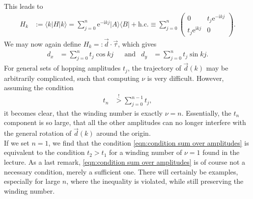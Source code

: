 \documentclass[english, parskip=full]{scrartcl}
\newcommand{\braket}{}
\newcommand{\oper}{}
\newcommand{\tecxt}{}
\renewcommand{\i}{\text{i}}
\newcommand{\e}{\text{e}}
\begin{document}
This leads to 
\begin{align}
H_k&:=\braket\langle k | H | k \rangle=\sum_{j=0}^n\e^{-\i kj}\oper | A \rangle\langle B |+\tecxt\text{h.c.}\equiv\sum_{j=0}^n \begin{pmatrix}
0&t_j\e^{-\i kj} \\ t_j\e^{\i kj} & 0
\end{pmatrix}.
\end{align}
We may now again define $H_k=:\vec{d}\cdot\vec{\tau}$, which gives
\begin{align}
d_x&=\sum_{j=0}^nt_j\cos kj&&\tecxt\text{and}&d_y&=\sum_{j=0}^nt_j\sin kj.
\end{align}
For general sets of hopping amplitudes $t_j$, the trajectory of $\vec{d}(k)$ may be arbitrarily complicated, such that computing $\nu$ is very difficult.
However, assuming the condition
\begin{align}
t_n&\overset{!}{>}\sum_{j=0}^{n-1}t_j, \label{eqn:condition sum over amplitudes}
\end{align}
it becomes clear, that the winding number is exactly $\nu=n$.
Essentially, the $t_n$ component is so large, that all the other amplitudes can no longer interfere with the general rotation of $\vec{d}(k)$ around the origin.
\\
If we set $n=1$, we find that the condition \eqref{eqn:condition sum over amplitudes} is equivalent to the condition $t_2>t_1$ for a winding number of $\nu=1$ found in the lecture.
As a last remark, \eqref{eqn:condition sum over amplitudes} is of course not a necessary condition, merely a sufficient one. 
There will certainly be examples, especially for large $n$, where the inequality is violated, while still preserving the winding number.
\newpage
\end{document}
